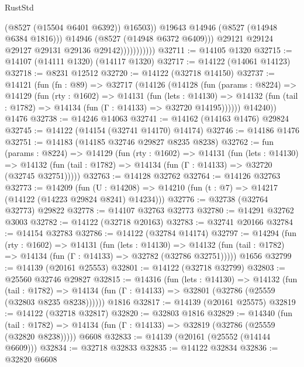 \begin{lexlean}{RustStd}
\begin{coremodule}
                                  (@8527 (@15504 @6401 @6392))
                                  @16503))
                              @19643
                              @14946
                              (@8527 (@14948 @6384 @1816)))
                            @14946
                            (@8527 (@14948 @6372 @6409)))
                          @29121
                          @29124
                          @29127
                          @29131
                          @29136
                          @29142)))))))))))
@32711 := @14105 @1320
@32715 := @14107 (@14111 @1320) (@14117 @1320)
@32717 := @14122 (@14061 @14123)
@32718 := @8231 @12512
@32720 := @14122 (@32718 @14150)
@32737 := @14121
    (fun (fn : @89) =>
    @32717
      (@14126
        (@14128
          (fun (params : @8224) =>
          @14129
            (fun (rty : @1602) =>
            @14131
              (fun (lets : @14130) =>
              @14132 (fun (tail : @1782) => @14134 (fun (Γ : @14133) => @32720 @14195))))))
        @14240))
    @1476
@32738 := @14246 @14063
@32741 := @14162 (@14163 @1476) @29824
@32745 := @14122 (@14154 (@32741 @14170) @14174)
@32746 := @14186 @1476
@32751 := @14183 (@14185 @32746 @29827 @8235 @8238)
@32762 := fun (params : @8224) =>
  @14129
    (fun (rty : @1602) =>
    @14131
      (fun (lets : @14130) =>
      @14132 (fun (tail : @1782) => @14134 (fun (Γ : @14133) => @32720 (@32745 @32751)))))
@32763 := @14128 @32762
@32764 := @14126 @32763
@32773 := @14209
    (fun (U : @14208) => @14210 (fun (t : @7) => @14217 (@14122 (@14223 @29824 @8241) @14234)))
@32776 := @32738 (@32764 @32773) @29822
@32778 := @14107 @32763 @32773
@32780 := @14291 @32762 @3003
@32782 := @14122 (@32718 @20163)
@32783 := @32741 @20166
@32784 := @14154 @32783
@32786 := @14122 (@32784 @14174)
@32797 := @14294
    (fun (rty : @1602) =>
    @14131
      (fun (lets : @14130) =>
      @14132 (fun (tail : @1782) => @14134 (fun (Γ : @14133) => @32782 (@32786 @32751)))))
    @1656
@32799 := @14139 (@20161 @25553)
@32801 := @14122 (@32718 @32799)
@32803 := @25560 @32746 @29827
@32815 := @14316
    (fun (lets : @14130) =>
    @14132
      (fun (tail : @1782) =>
      @14134 (fun (Γ : @14133) => @32801 (@32786 (@25559 (@32803 @8235 @8238))))))
    @1816
@32817 := @14139 (@20161 @25575)
@32819 := @14122 (@32718 @32817)
@32820 := @32803 @1816
@32829 := @14340
    (fun (tail : @1782) => @14134 (fun (Γ : @14133) => @32819 (@32786 (@25559 (@32820 @8238)))))
    @6608
@32833 := @14139 (@20161 (@25552 (@14144 @6609)))
@32834 := @32718 @32833
@32835 := @14122 @32834
@32836 := @32820 @6608

\end{coremodule}
\end{lexlean}

